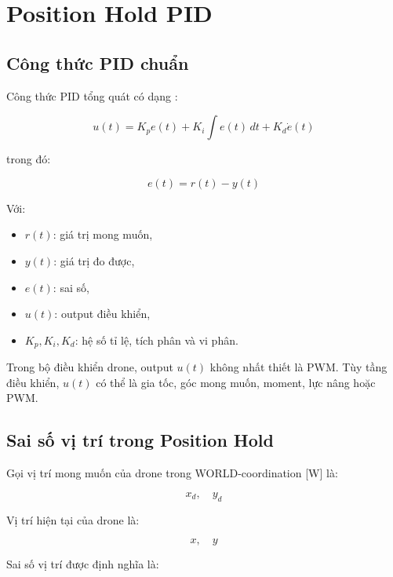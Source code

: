 \section{Position Hold PID}



\subsection{Công thức PID chuẩn}

Công thức PID tổng quát có dạng \cite{astrom1995pid}:

\begin{equation}
    u(t) = K_p e(t) + K_i \int e(t)\,dt + K_d \dot{e}(t)
\end{equation}

trong đó:

\begin{equation}
    e(t) = r(t) - y(t)
\end{equation}

Với:
\begin{itemize}
    \item $r(t)$: giá trị mong muốn,
    \item $y(t)$: giá trị đo được,
    \item $e(t)$: sai số,
    \item $u(t)$: output điều khiển,
    \item $K_p, K_i, K_d$: hệ số tỉ lệ, tích phân và vi phân.
\end{itemize}

Trong bộ điều khiển drone, output $u(t)$ không nhất thiết là PWM.
Tùy tầng điều khiển, $u(t)$ có thể là gia tốc, góc mong muốn, moment,
lực nâng hoặc PWM.

\subsection{Sai số vị trí trong Position Hold}

Gọi vị trí mong muốn của drone trong WORLD-coordination [W] là:

\begin{equation}
    x_d,\quad y_d
\end{equation}

Vị trí hiện tại của drone là:

\begin{equation}
    x,\quad y
\end{equation}

Sai số vị trí được định nghĩa là:

